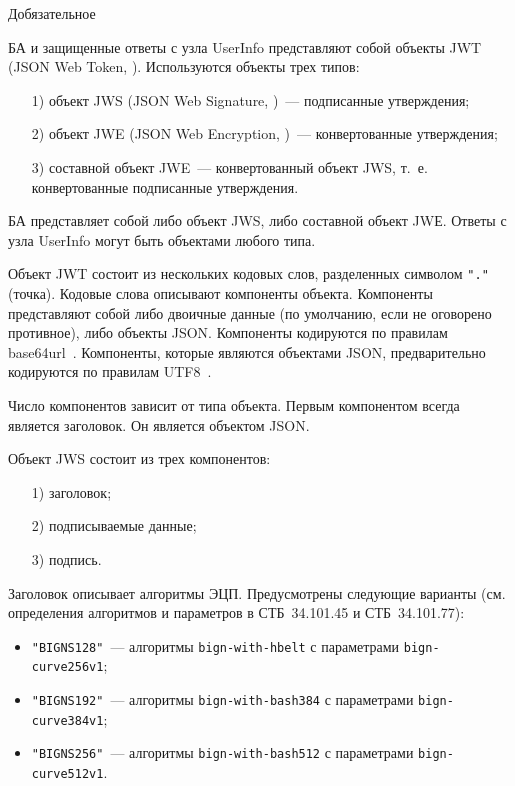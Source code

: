 \begin{appendix}{Д}{обязательное}{}\label{JWT}


БА и защищенные ответы с узла UserInfo представляют собой объекты 
JWT (JSON Web Token, \cite{RFC7519}).
%
Используются объекты трех типов: 
\begin{itemize}
\item[1)] 
объект JWS (JSON Web Signature, \cite{RFC7515})~--- подписанные утверждения;
\item[2)] 
объект JWE (JSON Web Encryption, \cite{RFC7516})~--- конвертованные утверждения;
\item[3)] 
составной объект JWE~--- конвертованный объект JWS, т.~е. конвертованные 
подписанные утверждения.
\end{itemize}

БА представляет собой либо объект JWS, либо составной объект JWЕ.
Ответы с узла UserInfo могут быть объектами любого типа. 

Объект JWT состоит из нескольких кодовых слов, разделенных символом
\lstinline{"."} (точка). Кодовые слова описывают компоненты объекта. 
%
Компоненты представляют собой либо двоичные данные (по умолчанию, если не 
оговорено противное), либо объекты JSON.
%
Компоненты кодируются по правилам base64url~\cite{RFC4648}. 
Компоненты, которые являются объектами JSON, предварительно кодируются по 
правилам UTF8~\cite{UTF8}.

Число компонентов зависит от типа объекта. Первым компонентом всегда является 
заголовок. Он является объектом JSON.

\label{JWT.JWS}

Объект JWS состоит из трех компонентов:
\begin{enumerate}
\item[1)]
заголовок;
\item[2)]
подписываемые данные;
\item[3)]
подпись.
\end{enumerate}

Заголовок описывает алгоритмы ЭЦП. Предусмотрены следующие варианты
(см. определения алгоритмов и параметров в СТБ~34.101.45 и СТБ~34.101.77):
\begin{itemize}
\item
\lstinline{"BIGNS128"}~--- алгоритмы \lstinline{bign-with-hbelt} с параметрами  
\lstinline{bign-curve256v1};
\item
\lstinline{"BIGNS192"}~--- алгоритмы \lstinline{bign-with-bash384} с 
параметрами \lstinline{bign-curve384v1};
\item
\lstinline{"BIGNS256"}~--- алгоритмы \lstinline{bign-with-bash512} с 
параметрами \lstinline{bign-curve512v1}.
\end{itemize}


\end{appendix}
